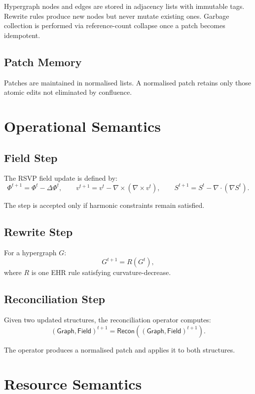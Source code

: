 Hypergraph nodes and edges are stored in adjacency lists with immutable tags.  
Rewrite rules produce new nodes but never mutate existing ones.  
Garbage collection is performed via reference-count collapse once a patch becomes idempotent.

\subsection{Patch Memory}

Patches are maintained in normalised lists.  
A normalised patch retains only those atomic edits not eliminated by confluence.

\section{Operational Semantics}

\subsection{Field Step}

The RSVP field update is defined by:
\[
\Phi^{t+1} = \Phi^t - \Delta \Phi^t,
\qquad
v^{t+1} = v^t - \nabla \times (\nabla \times v^t),
\qquad
S^{t+1} = S^t - \nabla\cdot(\nabla S^t).
\]

The step is accepted only if harmonic constraints remain satisfied.

\subsection{Rewrite Step}

For a hypergraph $G$:
\[
G^{t+1} = R(G^t),
\]
where $R$ is one EHR rule satisfying curvature-decrease.

\subsection{Reconciliation Step}

Given two updated structures, the reconciliation operator computes:
\[
(\mathsf{Graph},\mathsf{Field})^{t+1}
  = \mathsf{Recon}((\mathsf{Graph},\mathsf{Field})^{t+1}).
\]

The operator produces a normalised patch and applies it to both structures.

\section{Resource Semantics}

